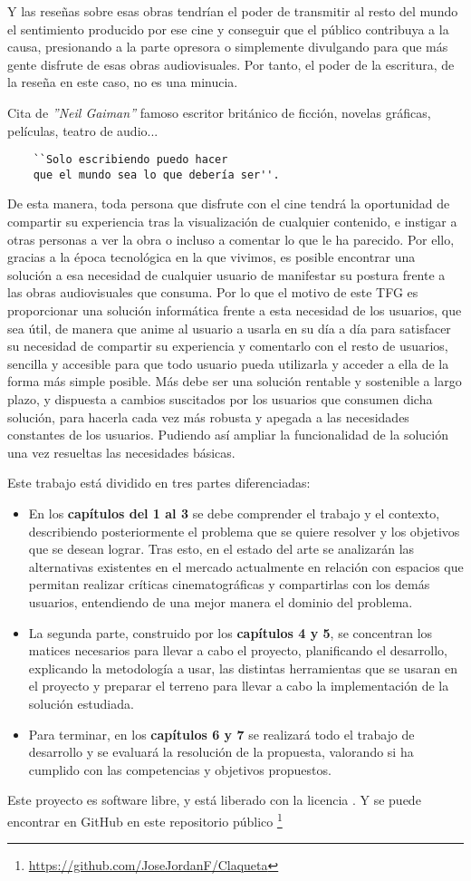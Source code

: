 Y las reseñas sobre esas obras tendrían el poder de transmitir al resto del mundo el sentimiento producido por ese cine y conseguir que el público contribuya a la causa, presionando a la parte opresora o simplemente divulgando para que más gente disfrute de esas obras audiovisuales. Por tanto, el poder de la escritura, de la reseña en este caso, no es una minucia.

Cita de \textit{''Neil Gaiman''}\cite{NeilG} famoso escritor británico de ficción, novelas gráficas,
películas, teatro de audio...
\begin{verbatim}
    ``Solo escribiendo puedo hacer 
    que el mundo sea lo que debería ser''.
\end{verbatim}

De esta manera, toda persona que disfrute con el cine tendrá la oportunidad de compartir su experiencia tras la visualización de cualquier contenido, e instigar a otras personas a ver la obra o incluso a comentar lo que le ha parecido. Por ello, gracias a la época tecnológica en la que vivimos, es posible encontrar una solución a esa necesidad de cualquier usuario de manifestar su postura frente a las obras audiovisuales que consuma. Por lo que el motivo de este TFG es proporcionar una solución informática frente a esta necesidad de los usuarios, que sea útil, de manera que anime al usuario a usarla en su día a día para satisfacer su necesidad de compartir su experiencia y comentarlo con el resto de usuarios, sencilla y accesible para que todo usuario pueda utilizarla y acceder a ella de la forma más simple posible. Más debe ser una solución rentable y sostenible a largo plazo, y dispuesta a cambios suscitados por los usuarios que consumen dicha solución, para hacerla cada vez más robusta y apegada a las necesidades constantes de los usuarios. Pudiendo así ampliar la funcionalidad de la solución una vez resueltas las necesidades básicas.

Este trabajo está dividido en tres partes diferenciadas:
\begin{itemize}
    \item En los \textbf{capítulos del 1 al 3} se debe comprender el trabajo y el contexto, describiendo posteriormente el problema que se quiere resolver y los objetivos que se desean lograr. Tras esto, en el estado del arte se analizarán las alternativas existentes en el mercado actualmente en relación con espacios que permitan realizar críticas cinematográficas y compartirlas con los demás usuarios, entendiendo de una mejor manera el dominio del problema.
    \item La segunda parte, construido por los \textbf{capítulos 4 y 5}, se concentran los matices 
    necesarios para llevar a cabo el proyecto, planificando el desarrollo, explicando la metodología a usar, las distintas herramientas que se usaran en el proyecto y preparar el terreno para llevar a cabo la implementación de la solución estudiada.
    \item Para terminar, en los \textbf{capítulos 6 y 7} se realizará todo el trabajo de desarrollo y se evaluará la resolución de la propuesta, valorando si ha cumplido con las competencias y objetivos propuestos.
\end{itemize}

Este proyecto es software libre, y está liberado con la licencia \cite{gplv3}. Y se puede encontrar en 
GitHub en este repositorio público \footnote{\url{https://github.com/JoseJordanF/Claqueta}}